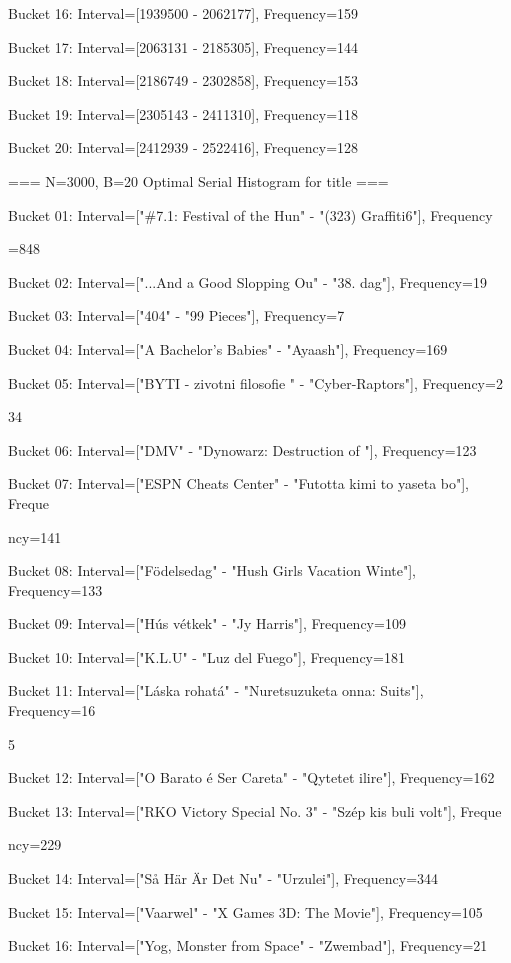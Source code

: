 \documentclass[11pt,a4paper]{article}
\begin{document}
{Bucket 16: Interval=[1939500 - 2062177], Frequency=159

Bucket 17: Interval=[2063131 - 2185305], Frequency=144

Bucket 18: Interval=[2186749 - 2302858], Frequency=153

Bucket 19: Interval=[2305143 - 2411310], Frequency=118

Bucket 20: Interval=[2412939 - 2522416], Frequency=128


=== N=3000, B=20 Optimal Serial Histogram for title ===

Bucket 01: Interval=["\#7.1: Festival of the Hun" - "(323) Graffiti6"], Frequency

=848

Bucket 02: Interval=["...And a Good Slopping Ou" - "38. dag"], Frequency=19

Bucket 03: Interval=["404" - "99 Pieces"], Frequency=7

Bucket 04: Interval=["A Bachelor's Babies" - "Ayaash"], Frequency=169

Bucket 05: Interval=["BYTI - zivotni filosofie " - "Cyber-Raptors"], Frequency=2

34

Bucket 06: Interval=["DMV" - "Dynowarz: Destruction of "], Frequency=123

Bucket 07: Interval=["ESPN Cheats Center" - "Futotta kimi to yaseta bo"], Freque

ncy=141

Bucket 08: Interval=["Födelsedag" - "Hush Girls Vacation Winte"], Frequency=133

Bucket 09: Interval=["Hús vétkek" - "Jy Harris"], Frequency=109

Bucket 10: Interval=["K.L.U" - "Luz del Fuego"], Frequency=181

Bucket 11: Interval=["Láska rohatá" - "Nuretsuzuketa onna: Suits"], Frequency=16

5

Bucket 12: Interval=["O Barato é Ser Careta" - "Qytetet ilire"], Frequency=162

Bucket 13: Interval=["RKO Victory Special No. 3" - "Szép kis buli volt"], Freque

ncy=229

Bucket 14: Interval=["Så Här Är Det Nu" - "Urzulei"], Frequency=344

Bucket 15: Interval=["Vaarwel" - "X Games 3D: The Movie"], Frequency=105

Bucket 16: Interval=["Yog, Monster from Space" - "Zwembad"], Frequency=21

}
\end{document}
